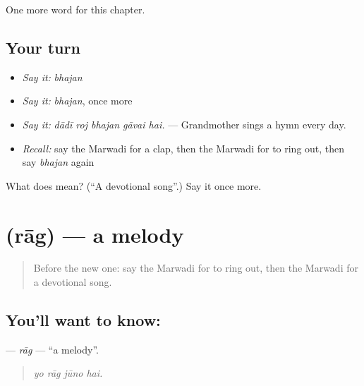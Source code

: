 \begin{grammarlens}[title={What you've built}]
One more word for this chapter.
\end{grammarlens}

\subsection*{Your turn}
\begin{itemize}
\raggedright
  \item \emph{Say it:} \emph{bhajan}
  \item \emph{Say it:} \emph{bhajan}, once more
  \item \emph{Say it:} \emph{dādī roj bhajan gāvai hai.} — Grandmother sings a hymn every day.
  \item \emph{Recall:} say the Marwadi for a clap, then the Marwadi for to ring out, then say \emph{bhajan} again
\end{itemize}

\begin{tcolorbox}[breakable,colback=teal!4,colframe=teal!35!black,title={Before you move on}]
What does  mean? (\textquotedblleft{}A devotional song\textquotedblright{}.) Say it once more.
\end{tcolorbox}
\section[\texorpdfstring{\mw{राग} (rāg)}{राग (rāg)}]{ (rāg) — a melody}

\label{lesson:MW-C277-rag}



\begin{quote}
Before the new one: say the Marwadi for to ring out, then the Marwadi for a devotional song.
\end{quote}

\subsection*{You'll want to know: }
\textbf{} — \emph{rāg} — \textquotedblleft{}a melody\textquotedblright{}.

\begin{quote}
   
\end{quote}

\begin{quote}
\emph{yo rāg jūno hai.}
\end{quote}

